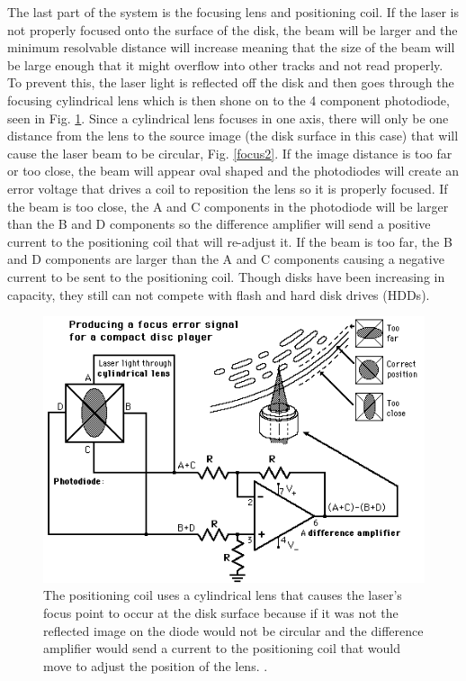 \documentclass[ notitlepage, numerical, 11pt]{revtex4-1} %
\begin{document}
The last part of the system is the focusing lens and positioning coil. If the laser is not properly focused onto the surface of the disk, the beam will be larger and the minimum resolvable distance will increase meaning that the size of the beam will be large enough that it might overflow into other tracks and not read properly. To prevent this, the laser light is reflected off the disk and then goes through the focusing cylindrical lens which is then shone on to the 4 component photodiode, seen in Fig. \ref{focus}. Since a cylindrical lens focuses in one axis, there will only be one distance from the lens to the source image (the disk surface in this case) that will cause the laser beam to be circular, Fig. \ref{focus2}. If the image distance is too far or too close, the beam will appear oval shaped and the photodiodes will create an error voltage that drives a coil to reposition the lens so it is properly focused. If the beam is too close, the A and C components in the photodiode will be larger than the B and D components so the difference amplifier will send a positive current to the positioning coil that will re-adjust it. If the beam is too far, the B and D components are larger than the A and C components causing a negative current to be sent to the positioning coil. Though disks have been increasing in capacity, they still can not compete with flash and hard disk drives (HDDs).




\begin{figure}[H]
\centerline{\includegraphics[scale=.7]{focus.png}}
\caption{The positioning coil uses a cylindrical lens that causes the laser's focus point to occur at the disk surface because if it was not the reflected image on the diode would not be circular and the difference amplifier would send a current to the positioning coil that would move to adjust the position of the lens. \cite {hyper}.}
\label{focus}
\end{figure} 
\end{document}
